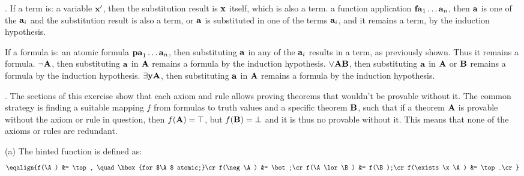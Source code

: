 . If a term is:
 a variable ${\bf x}'$, then the substitution result is ${\bf x}$ itself, which 
is also a term.
 a function application ${\bf fa}_1 \dots {\bf a}_n$, then ${\bf a}$ is one of 
the ${\bf a}_i$ and the substitution result is also a term, or ${\bf a}$ is substituted
in one of the terms ${\bf a}_i$, and it remains a term, by the induction hypothesis.

If a formula is:
 an atomic formula ${\bf pa}_1 \dots {\bf a}_n$, then substituting ${\bf a}$ in
any of the ${\bf a}_i$ results in a term, as previously shown. Thus it remains a formula.
 $\neg {\bf A}$, then substituting ${\bf a}$ in ${\bf A}$ remains a formula by the
induction hypothesis.
 $\lor{\bf A}{\bf B}$, then substituting ${\bf a}$ in ${\bf A}$ or ${\bf B}$ remains a 
formula by the induction hypothesis.
 $\exists{\bf y}{\bf A}$, then substituting ${\bf a}$ in ${\bf A}$ remains a formula 
by the induction hypothesis.
\medskip

. The sections of this exercise show that each axiom and rule allows
proving theorems that wouldn't be provable without it. The common strategy
is finding a suitable mapping $f$ from formulas to truth values and a specific 
theorem ${\bf B}$, such that if a theorem ${\bf A}$ is provable without the axiom or rule in 
question, then $f({\bf A}) = \top$, but $f({\bf B}) = \bot$ and it is thus no provable
without it. This means that none of the axioms or rules are redundant.
\smallskip

\ansitem (a)
The hinted function is defined as:
$$\eqalign{f(\A) &= \top, \quad \hbox{for $\A$ atomic;}\cr
f(\neg \A) &= \bot;\cr
f(\A \lor \B) &= f(\B);\cr
f(\exists \x\A) &= \top.\cr}$$

